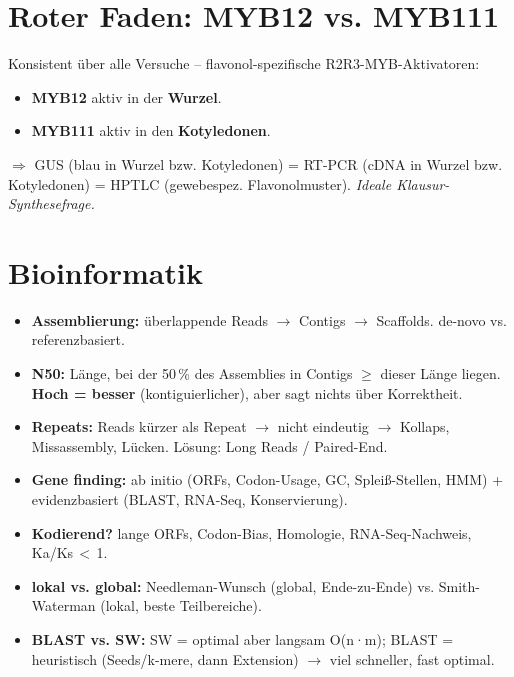 \section{Roter Faden: MYB12 vs. MYB111}
Konsistent über alle Versuche -- flavonol-spezifische R2R3-MYB-Aktivatoren:
\begin{itemize}
    \item \textbf{MYB12} aktiv in der \textbf{Wurzel}.
    \item \textbf{MYB111} aktiv in den \textbf{Kotyledonen}.
\end{itemize}
$\Rightarrow$ GUS (blau in Wurzel bzw. Kotyledonen) = RT-PCR (cDNA in Wurzel bzw. Kotyledonen) = HPTLC (gewebespez. Flavonolmuster). \emph{Ideale Klausur-Synthesefrage.}





\section{Bioinformatik}
\begin{itemize}
    \item \textbf{Assemblierung:} überlappende Reads $\to$ Contigs $\to$ Scaffolds. de-novo vs. referenzbasiert.
    \item \textbf{N50:} Länge, bei der 50\,\% des Assemblies in Contigs $\geq$ dieser Länge liegen. \textbf{Hoch = besser} (kontiguierlicher), aber sagt nichts über Korrektheit.
    \item \textbf{Repeats:} Reads kürzer als Repeat $\to$ nicht eindeutig $\to$ Kollaps, Missassembly, Lücken. Lösung: Long Reads / Paired-End.
    \item \textbf{Gene finding:} ab initio (ORFs, Codon-Usage, GC, Spleiß-Stellen, HMM) + evidenzbasiert (BLAST, RNA-Seq, Konservierung).
    \item \textbf{Kodierend?} lange ORFs, Codon-Bias, Homologie, RNA-Seq-Nachweis, Ka/Ks\,$<$\,1.
    \item \textbf{lokal vs. global:} Needleman-Wunsch (global, Ende-zu-Ende) vs. Smith-Waterman (lokal, beste Teilbereiche).
    \item \textbf{BLAST vs. SW:} SW = optimal aber langsam O(n·m); BLAST = heuristisch (Seeds/k-mere, dann Extension) $\to$ viel schneller, fast optimal.
\end{itemize}



